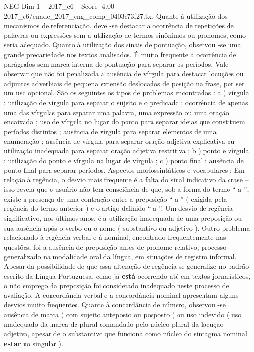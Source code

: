 \begin{textsample}{NEG Dim 1 – 2017\_c6 – Score -4.00 – 2017\_c6/enade\_2017\_eng\_comp\_0403c73f27.txt}
Quanto à utilização dos mecanismos de referenciação, deve -se destacar a ocorrência de repetições de palavras ou expressões sem a utilização de termos sinônimos ou pronomes, como seria adequado.
Quanto à utilização dos sinais de pontuação, observou -se uma grande precariedade nos textos analisados.
É muito frequente a ocorrência de parágrafos sem marca interna de pontuação para separar os períodos.
Vale observar que não foi penalizada a ausência de vírgula para destacar locuções ou adjuntos adverbiais de pequena extensão deslocados de posição na frase, por ser um uso opcional.
São os seguintes os tipos de problemas encontrados : a ) vírgula : utilização de vírgula para separar o sujeito e o predicado ; ocorrência de apenas uma das vírgulas para separar uma palavra, uma expressão ou uma oração encaixada ; uso de vírgula no lugar do ponto para separar ideias que constituem períodos distintos ; ausência de vírgula para separar elementos de uma enumeração ; ausência de vírgula para separar oração adjetiva explicativa ou utilização inadequada para separar oração adjetiva restritiva ; b ) ponto e vírgula : utilização do ponto e vírgula no lugar de vírgula ; c ) ponto final : ausência de ponto final para separar períodos.
Aspectos morfossintáticos e vocabulares : Em relação à regência, o desvio mais frequente é a falta do sinal indicativo da crase – isso revela que o usuário não tem consciência de que, sob a forma do termo “ a ”, existe a presença de uma contração entre a preposição “ a ” ( exigida pela regência do termo anterior ) e o artigo definido “ a ”.
Um desvio de regência significativo, nos últimos anos, é a utilização inadequada de uma preposição ou sua ausência após o verbo ou o nome ( substantivo ou adjetivo ).
Outro problema relacionado à regência verbal e à nominal, encontrado frequentemente nas questões, foi a ausência de preposição antes de pronome relativo, processo generalizado na modalidade oral da língua, em situações de registro informal.
Apesar da possibilidade de que essa alteração de regência se generalize no padrão escrito da Língua Portuguesa, como já \textbf{está} ocorrendo até em textos jornalísticos, o não emprego da preposição foi considerado inadequado neste processo de avaliação.
A concordância verbal e a concordância nominal apresentam alguns desvios muito frequentes.
Quanto à concordância de número, observou -se ausência de marca ( com sujeito anteposto ou posposto ) ou uso indevido ( uso inadequado da marca de plural comandado pelo núcleo plural da locução adjetiva, apesar de o substantivo que funciona como núcleo do sintagma nominal \textbf{estar} no singular ).

\end{textsample}
